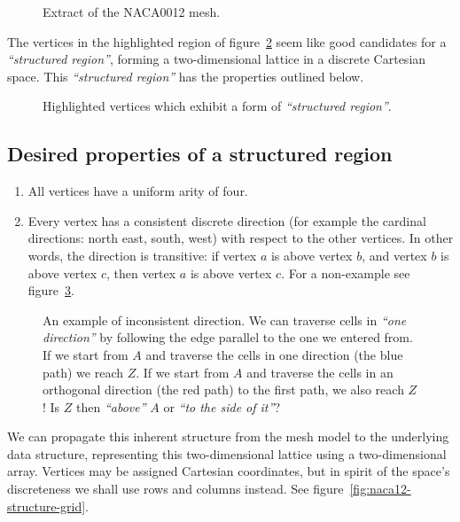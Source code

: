 \newcommand{\drawnaca}[4]{
	\begin{figure}
	
	\caption{#3}
	\label{#4}
	\end{figure}
}
\drawnaca{images/defining-structure/}{naca0012-plain}{Extract of the NACA0012 mesh.}{fig:naca12-plain}

The vertices in the highlighted region of figure~\ref{fig:naca12-vertices} seem like good candidates for a \emph{``structured region''}, forming a two-dimensional lattice in a discrete Cartesian space. This \emph{``structured region''} has the properties outlined below.

\drawnaca{images/defining-structure/}{naca0012-node-structure}{Highlighted vertices which exhibit a form of \emph{``structured region''}.}{fig:naca12-vertices}

\subsection{Desired properties of a structured region}
\label{sec:structured-region-properties}
\begin{enumerate}
\item All vertices have a uniform arity of four.
\item Every vertex has a consistent discrete direction (for example the cardinal directions: north east, south, west) with respect to the other vertices. In other words, the direction is transitive: if vertex $a$ is above vertex $b$, and vertex $b$ is above vertex $c$, then vertex $a$ is above vertex $c$. For a non-example see figure~\ref{fig:non-consistent-direction}.
\end{enumerate}

\begin{figure}

\caption{An example of inconsistent direction. We can traverse cells in \emph{``one direction''} by following the edge parallel to the one we entered from. If we start from $A$ and traverse the cells in one direction (the blue path) we reach $Z$. If we start from $A$ and traverse the cells in an orthogonal direction (the red path) to the first path, we also reach $Z$! Is $Z$ then \emph{``above''} $A$ or \emph{``to the side of it''}?}
\label{fig:non-consistent-direction}
\end{figure}


We can propagate this inherent structure from the mesh model to the underlying data structure, representing this two-dimensional lattice using a two-dimensional array. Vertices may be assigned Cartesian coordinates, but in spirit of the space's discreteness we shall use rows and columns instead. See figure~\ref{fig:naca12-structure-grid}.\label{sentence:2d-array}

